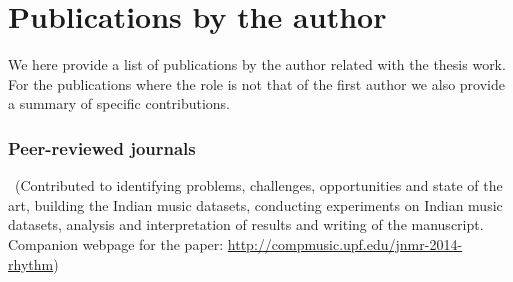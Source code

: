 \newcommand\contrib[1]{~{\footnotesize (#1)}}
% 
\newcommand\resource[2]{
	\noindent #1 \par
	\vspace{0.2em}
	{\centering	\url{#2} \par}
	\vspace{0.5em}
	\hrule \par 
	\vspace{0.8em} \par}
%
%
\chapter[Publications by the author][Publications by the author]{Publications by the author}\label{app:mypapers}%

We here provide a list of publications by the author related with the thesis work. For the publications where the role is not that of the first author we also provide a summary of specific contributions. 

\subsection*{Peer-reviewed journals}
\begin{itemize}[leftmargin=*]
%	
	\contrib{Contributed to identifying problems, challenges, opportunities and state of the art, building the Indian music datasets, conducting experiments on Indian music datasets, analysis and interpretation of results and writing of the manuscript. Companion webpage for the paper: \url{http://compmusic.upf.edu/jnmr-2014-rhythm}} %
\end{itemize}
%
